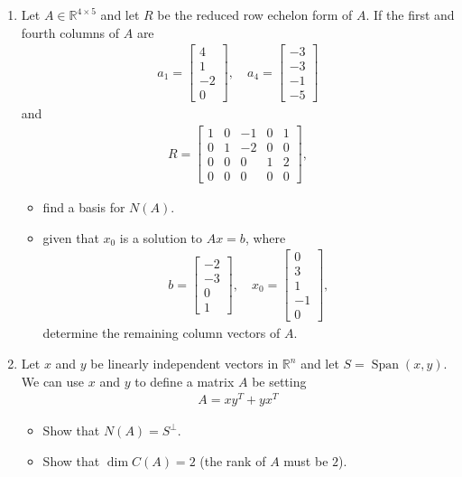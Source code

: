 \documentclass[a4paper,11pt]{article}
\begin{document}
\begin{enumerate}
  \item Let $A\in\mathbb{R}^{4\times 5}$ and let $R$ be the reduced row echelon form of $A$. If the first and fourth columns of $A$ are
  \begin{align*}
  a_1=\left[\begin{array}{c}4 \\ 1 \\-2 \\ 0\end{array}\right], \quad a_4= \left[\begin{array}{c}-3 \\ -3 \\-1 \\ -5\end{array}\right]
  \end{align*}
and
\begin{align*}
R=\left[\begin{array}{ccccc}
1 & 0 & -1 & 0 & 1\\
0 & 1& -2 &0 & 0\\
0 & 0 & 0 & 1 & 2\\
0 & 0 & 0 & 0 & 0
\end{array}\right],
\end{align*}
\begin{itemize}
  \item[(a)] find a basis for $N(A)$.
  \item[(b)] given that $x_0$ is a solution to $Ax=b$, where
  \begin{align*}
  b=\left[\begin{array}{c}-2 \\ -3 \\ 0 \\ 1\end{array}\right], \quad x_0= \left[\begin{array}{c}0 \\ 3 \\ 1 \\ -1 \\ 0 \end{array}\right],
  \end{align*}
  determine the remaining column vectors of $A$.
  \end{itemize}
  
  

\item Let $x$ and $y$ be linearly independent vectors in $\mathbb{R}^n$ and let $S=\operatorname{Span}(x,y)$. We can use $x$ and $y$ to define a matrix $A$ be setting
\begin{align*}
A=xy^T+yx^T
\end{align*}
\begin{itemize}
  \item[(a)] Show that $N(A)=S^{\perp}$.
  \item[(b)] Show that $\operatorname{dim} C(A)=2$ (the rank of $A$ must be $2$).
\end{itemize}
\end{enumerate}

%
%
\end{document}
